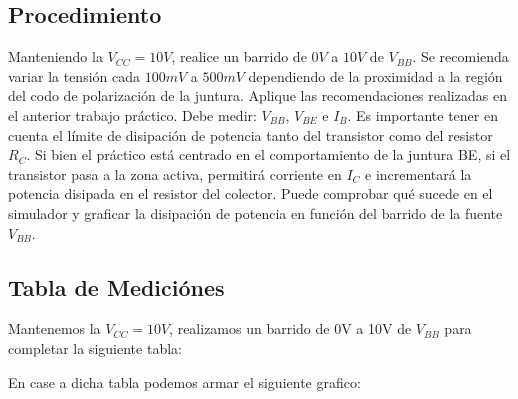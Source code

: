 \newpage

\subsection{Procedimiento}

Manteniendo la $V_{CC} = 10V$, realice un barrido de $0V$ a $10V$ de $V_{BB}$. Se recomienda variar la tensión cada $100mV$ a $500mV$ dependiendo de la proximidad a la región del codo de polarización de la juntura. Aplique las recomendaciones realizadas en el anterior trabajo práctico. Debe medir: $V_{BB}$, $V_{BE}$ e $I_B$. Es importante tener en cuenta el límite de disipación de potencia tanto del transistor como del resistor $R_C$. Si bien el práctico está centrado en el comportamiento de la juntura BE, si el transistor pasa a la zona activa, permitirá corriente en $I_C$ e incrementará la potencia disipada en el resistor del colector. Puede comprobar qué sucede en el simulador y graficar la disipación de potencia en función del barrido de la fuente $V_{BB}$.

\subsection{Tabla de Mediciónes}
Mantenemos la $V_{CC} = 10V$, realizamos un barrido de 0V a 10V de $V_{BB}$ para completar la siguiente tabla:

\begin{table}[ht]
\end{table}

En case a dicha tabla podemos armar el siguiente grafico:

